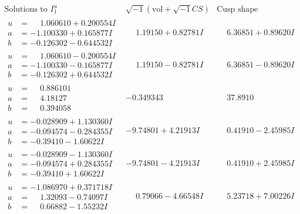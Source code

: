 \documentclass[1p]{elsarticle_modified}
\theoremstyle{definition}
\newcommand{\I}{\sqrt{-1}}
\begin{document}
$$\begin{array}{c|c|c}  
\text{Solutions to }I^u_{1}& \I (\text{vol} + \sqrt{-1}CS) & \text{Cusp shape}\\
 \hline 
\begin{aligned}
u &= \phantom{-}1.060610 + 0.200554 I \\
a &= -1.100330 + 0.165877 I \\
b &= -0.126302 - 0.644532 I\end{aligned}
 & \phantom{-}1.19150 + 0.82781 I & \phantom{-}6.36851 + 0.89620 I \\ \hline\begin{aligned}
u &= \phantom{-}1.060610 - 0.200554 I \\
a &= -1.100330 - 0.165877 I \\
b &= -0.126302 + 0.644532 I\end{aligned}
 & \phantom{-}1.19150 - 0.82781 I & \phantom{-}6.36851 - 0.89620 I \\ \hline\begin{aligned}
u &= \phantom{-}0.886101\phantom{ +0.000000I} \\
a &= \phantom{-}4.18127\phantom{ +0.000000I} \\
b &= \phantom{-}0.394058\phantom{ +0.000000I}\end{aligned}
 & -0.349343\phantom{ +0.000000I} & \phantom{-}37.8910\phantom{ +0.000000I} \\ \hline\begin{aligned}
u &= -0.028909 + 1.130360 I \\
a &= -0.094574 - 0.284355 I \\
b &= -0.39410 - 1.60622 I\end{aligned}
 & -9.74801 + 4.21913 I & \phantom{-}0.41910 - 2.45985 I \\ \hline\begin{aligned}
u &= -0.028909 - 1.130360 I \\
a &= -0.094574 + 0.284355 I \\
b &= -0.39410 + 1.60622 I\end{aligned}
 & -9.74801 - 4.21913 I & \phantom{-}0.41910 + 2.45985 I \\ \hline\begin{aligned}
u &= -1.086970 + 0.371718 I \\
a &= \phantom{-}1.32093 - 0.74097 I \\
b &= \phantom{-}0.66882 - 1.55232 I\end{aligned}
 & \phantom{-}0.79066 - 4.66548 I & \phantom{-}5.23718 + 7.00226 I \\ \hline\begin{aligned}

\end{aligned}
\end{array}$$
\end{document}
